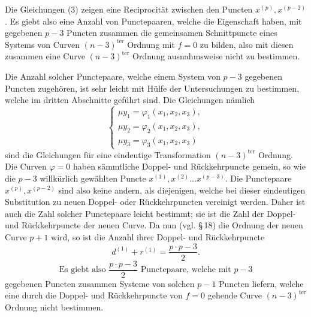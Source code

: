 \documentclass[10pt]{article}
\begin{document}
Die Gleichungen (3) zeigen eine Reciprocität zwischen den Puncten \(x^{(p)},x^{(p-2)}\). Es giebt also eine Anzahl von Punctepaaren, welche die Eigenschaft haben, mit gegebenen \(p-3\) Puncten zusammen die gemeinsamen Schnittpuncte eines Systems von Curven \((n-3)^{\mathrm{ter}}\) Ordnung mit \(f=0\) zu bilden, also mit diesen zusammen eine Curve \((n-3)^{\mathrm{ter}}\) Ordnung ausnahmsweise nicht zu bestimmen.

Die Anzahl solcher Punctepaare, welche einem System von \(p-3\) gegebenen Puncten zugehören, ist sehr leicht mit Hülfe der Untersuchungen zu bestimmen, welche im dritten Abschnitte geführt sind. Die Gleichungen nämlich
\[
\tag{4}
\begin{cases}
\mu y_1=\varphi_1(x_1,x_2,x_3),\\
\mu y_2=\varphi_2(x_1,x_2,x_3),\\
\mu y_3=\varphi_3(x_1,x_2,x_3)
\end{cases}
\]
sind die Gleichungen für eine eindeutige Transformation \((n-3)^{\mathrm{ter}}\) Ordnung. Die Curven \(\varphi=0\) haben sämmtliche Doppel- und Rückkehrpuncte gemein, so wie die \(p-3\) willkürlich gewählten Puncte \(x^{(1)},x^{(2)}\ldots x^{(p-3)}\). Die Punctepaare \(x^{(p)},x^{(p-2)}\) sind also keine andern, als diejenigen, welche bei dieser eindeutigen Substitution zu neuen Doppel- oder Rückkehrpuncten vereinigt werden. Daher ist auch die Zahl solcher Punctepaare leicht bestimmt; sie ist die Zahl der Doppel- und Rückkehrpuncte der neuen Curve. Da nun (vgl. \S\,18) die Ordnung der neuen Curve \(p+1\) wird, so ist die Anzahl ihrer Doppel- und Rückkehrpuncte
\[
d^{(1)}+r^{(1)}=\frac{p\cdot p-3}{2}.
\]
\[
\text{Es giebt also }\frac{p\cdot p-3}{2}\text{ Punctepaare, welche mit }p-3
\]
gegebenen Puncten zusammen Systeme von solchen \(p-1\) Puncten liefern, welche eine durch die Doppel- und Rückkehrpuncte von \(f=0\) gehende Curve \((n-3)^{\mathrm{ter}}\) Ordnung nicht bestimmen.
\end{document}
